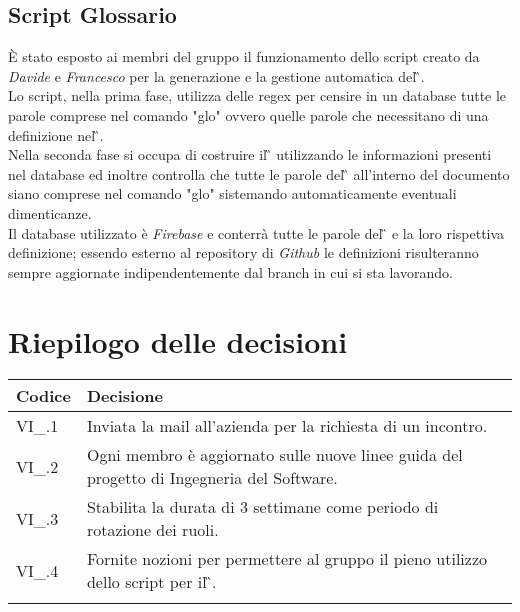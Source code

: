 \subsection{Script Glossario}

È stato esposto ai membri del gruppo il funzionamento dello script creato da \textit{Davide} e \textit{Francesco}
per la generazione e la gestione automatica del \G{}.\\
Lo script, nella prima fase, utilizza delle regex per censire in un database tutte le parole comprese nel comando "glo" ovvero quelle parole che necessitano di una definizione nel \G{}.\\
Nella seconda fase si occupa di costruire il \G{} utilizzando le informazioni presenti nel database ed inoltre controlla che tutte le parole del \G{} all'interno del documento siano comprese nel comando "glo" sistemando automaticamente eventuali dimenticanze.\\
Il database utilizzato è \textit{Firebase} e conterrà tutte le parole del \G{} e la loro rispettiva definizione; essendo esterno al repository di \textit{Github} le definizioni risulteranno sempre aggiornate indipendentemente dal branch in cui si sta lavorando.


\newpage

\section{Riepilogo delle decisioni \hfil}
{
	\setlength{\freewidth}{\dimexpr\textwidth-4\tabcolsep}
	\renewcommand{\arraystretch}{1.5}
	\setlength{\aboverulesep}{0pt}
	\setlength{\belowrulesep}{0pt}
	\begin{longtable}{L{.3\freewidth} L{.7\freewidth}}
		\toprule 
		\textbf{Codice} & \textbf{Decisione}\\
		\toprule
		\endhead
		
		VI\_\DataMeeting{}.1 & Inviata la mail all'azienda per la richiesta di un incontro. \\  
		VI\_\DataMeeting{}.2 & Ogni membro è aggiornato sulle nuove linee guida del progetto di Ingegneria del Software. \\
		VI\_\DataMeeting{}.3 & Stabilita la durata di 3 settimane come periodo di rotazione dei ruoli. \\ 
		VI\_\DataMeeting{}.4 & Fornite nozioni per permettere al gruppo il pieno utilizzo dello script per il \G{}. \\
		
		\bottomrule
		\hiderowcolors
	\end{longtable}
}